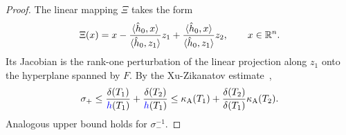 \documentclass[10pt,a4paper]{article}
\begin{document}
\begin{proof}
    \color{blue}
    \color{red}
    The linear mapping $\Xi$ takes the form 
    \begin{align*}
        \Xi(x) 
        = 
        x 
        - \frac{ \langle \hat h_0, x \rangle }{ \langle \hat h_0, z_1 \rangle } z_1
        + \frac{ \langle \hat h_0, x \rangle }{ \langle \hat h_0, z_1 \rangle } z_2
        ,
        \qquad 
        x \in {\mathbb R}^{n}
        .
    \end{align*}
    Its Jacobian is the rank-one perturbation of the linear projection along $z_1$ onto the hyperplane spanned by $F$. 
    By the Xu-Zikanatov estimate~\cite{xu2003some},
    \begin{align*}
        \sigma_{+} 
        \leq 
        \frac{ \diam(T_1) }{ \height(T_1) }
        +
        \frac{ \diam(T_2) }{ \height(T_1) }
        \leq 
        \aspectratio(T_1) + \frac{ \diam(T_2) }{ \diam(T_1) } \aspectratio(T_2)
        .
    \end{align*}
    Analogous upper bound holds for $\sigma^{-1}_{-}$.

\end{proof}
\end{document}
